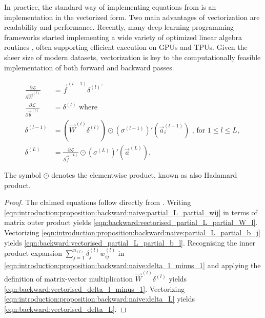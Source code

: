 In practice, the standard way of implementing equations from  is an implementation in the vectorized form. Two main advantages of vectorization are readability and performance. Recently, many deep learning programming frameworks started implementing a wide variety of optimized linear algebra routines \cite{li_2020_the}, often supporting efficient execution on GPUs and TPUs. Given the sheer size of modern datasets, vectorization is key to the computationally feasible implementation of both forward and backward passes.
\begin{corollary}
\label{corollary:introduction:backprop:vectorised}
\begin{subequations}
\begin{align}
    \frac{\partial \mathcal{L}}{\partial \vec{W}^{(l)}} &= \vec{f}^{(l-1)} \delta^{(l)^{\top}} \label{eqn:backward:vectorised_partial_L_partial_W_l} \\ 
    \frac{\partial \mathcal{L}}{\partial \vec{b}^{(l)}} &= \delta^{(l)} \label{eqn:backward:vectorised_partial_L_partial_b_l} \text{ where } \\
    \delta^{(l-1)} &= \left ( \vec{W}^{(l)} \delta^{(l)} \right ) \odot  \left(\sigma^{(l - 1)}\right){'} ( \vec{a}_{i}^{(l - 1)}) \label{eqn:backward:vectorised_delta_l_minus_1} \text{ , for $1 \leq l \leq L$, }\\ 
    \delta^{(L)} &= \frac{\partial \mathcal{L}}{\partial \vec{f}^{(L)} } \odot  \left(\sigma^{(L)}\right){'} ( \vec{a}^{(L)}). \label{eqn:backward:vectorised_delta_L}
\end{align}
\end{subequations}
\end{corollary}
\begin{remark}
The symbol $\odot$ denotes the elementwise product, known as also Hadamard product.
\end{remark}
\begin{proof}
The claimed equations follow directly from . Writing \ref{eqn:introduction:proposition:backward:naive:partial_L_partial_wij} in terms of matrix outer product yields \ref{eqn:backward:vectorised_partial_L_partial_W_l}. Vectorizing \ref{eqn:introduction:proposition:backward:naive:partial_L_partial_b_j} yields \ref{eqn:backward:vectorised_partial_L_partial_b_l}.
Recognising the inner product expansion $\sum_{j=1}^{n_{(l)}} \delta_j^{(l)} w_{ij}^{(l)}$ in \ref{eqn:introduction:proposition:backward:naive:delta_l_minus_1} and applying the definition of matrix-vector multiplication $\vec{W}^{(l)} \delta^{(l)}$ yields \ref{eqn:backward:vectorised_delta_l_minus_1}. Vectorizing \ref{eqn:introduction:proposition:backward:naive:delta_L} yields \ref{eqn:backward:vectorised_delta_L}.
\end{proof}

